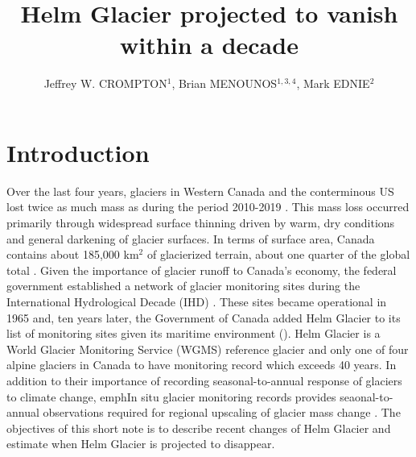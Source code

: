 \documentclass[annals,review,oneside]{igs}
\begin{document}
\title[Deglaciation of Helm]{Helm Glacier projected to vanish within a decade}

\author[gsc]{Jeffrey W. CROMPTON$^1$, Brian MENOUNOS$^{1,3,4}$, Mark EDNIE$^{2}$}




\maketitle

\section{Introduction}

Over the last four years, glaciers in Western Canada and the conterminous US lost twice as much mass as during the period 2010-2019  \citep{Menounos2025}. This mass loss occurred primarily through widespread surface thinning driven by warm, dry conditions and general darkening of glacier surfaces. In terms of surface area, Canada contains about 185,000 km$^{2}$ of glacierized terrain, about one quarter of the global total \citep{rgi70}.  Given the importance of glacier runoff to Canada's economy, the federal government established a network of glacier monitoring sites during the International Hydrological Decade (IHD) \citep{Ommanney1986}. These sites became operational in 1965 and, ten years later, the Government of Canada added Helm Glacier to its list of monitoring sites given its maritime environment (\cite{Ommanney2002}). Helm Glacier is a World Glacier Monitoring Service (WGMS) reference glacier and only one of four alpine glaciers in Canada to have monitoring record which exceeds 40 years.  In addition to their importance of recording  seasonal-to-annual response of glaciers to climate change, emph{In situ} glacier monitoring records provides seaonal-to-annual observations required for regional upscaling of glacier mass change \citep{Zemp2019}. The objectives of this short note is to describe recent changes of Helm Glacier and estimate when Helm Glacier is projected to disappear. 
\end{document}

